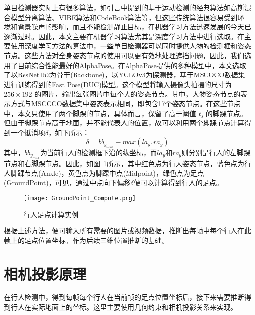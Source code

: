 单目检测器实际上有很多算法，如引言中提到的基于运动检测的经典算法如高斯混合模型分离算法、VIBE算法和CodeBook算法等，但这些传统算法很容易受到环境和背景噪声的影响，而且不能检测静止目标，在机器学习方法迅速发展的今天已逐渐过时。因此，本文主要在机器学习算法尤其是深度学习方法中进行选取。在主要使用深度学习方法的算法中，一些单目检测器可以同时提供人物的检测框和姿态节点\cite{li2019crowdpose}。这些方法对全身姿态节点的使用可以更有效地处理遮挡问题，因此，我们选用了目前综合性能最好的AlphaPose。在AlphaPose提供的多种模型中，本文选取了以ResNet152为骨干(Backbone)，以YOLOv3为探测器，基于MSCOCO数据集\cite{lin2014microsoft}进行训练得到的Fast Pose(DUC)\cite{fang2017rmpe, li2018crowdpose, xiu2018poseflow}模型。这个模型将输入摄像头拍摄的尺寸为 $256 \times 192$ 的图片，输出每张图片中每个人的姿态节点。其中，人物姿态节点的表示方式与MSCOCO数据集\cite{lin2014microsoft}中姿态表示相同，即包含17个姿态节点。在这些节点中，本文只使用了两个脚踝的节点，具体而言，保留了高于阈值 $t_s$ 的脚踝节点。但由于脚踝节点高于地面，并不能代表人的位置，故可以利用两个脚踝节点计算得到一个抵消项$\delta$，如下所示：
\begin{equation*}
 \delta = bb_{y_{max}} - max(la_y, ra_y)
\end{equation*}
其中，$bb_{y_{max}}$为当前行人的检测框下沿的纵坐标，而$la_y$和$ra_y$则分别是行人的左脚踝节点和右脚踝节点。因此，如图~\ref{GroundPoint_Compute}所示，其中红色点为行人姿态节点，蓝色点为行人脚踝节点(Ankle)，黄色点为脚踝中点(Midpoint)，绿色点为足点(GroundPoint)，可见，通过中点向下偏移$\delta$便可以计算得到行人的足点。
\begin{figure}
    \centering
    \texttt{[image: GroundPoint\_Compute.png]}
    \caption{行人足点计算实例}
    \label{GroundPoint_Compute}
\end{figure}
根据上述方法，便可输入所有需要的图片或视频数据，推断出每帧中每个行人在此帧上的足点位置坐标，作为后续三维位置推断的基础。

\section{相机投影原理}

在行人检测中，得到每帧每个行人在当前帧的足点位置坐标后，接下来需要推断得到行人在实际地面上的坐标。这里主要使用几何约束和相机投影关系来实现。

